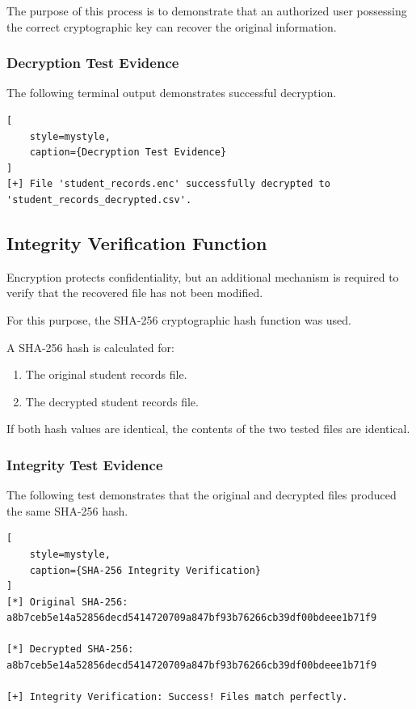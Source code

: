 \documentclass[12pt,a4paper]{article}
\begin{document}
The purpose of this process is to demonstrate that an authorized user possessing the correct cryptographic key can recover the original information.

\subsubsection{Decryption Test Evidence}

The following terminal output demonstrates successful decryption.

\begin{lstlisting}[
    style=mystyle,
    caption={Decryption Test Evidence}
]
[+] File 'student_records.enc' successfully decrypted to 'student_records_decrypted.csv'.
\end{lstlisting}

\subsection{Integrity Verification Function}

Encryption protects confidentiality, but an additional mechanism is required to verify that the recovered file has not been modified.

For this purpose, the SHA-256 cryptographic hash function was used.

A SHA-256 hash is calculated for:

\begin{enumerate}
    \item The original student records file.
    \item The decrypted student records file.
\end{enumerate}

If both hash values are identical, the contents of the two tested files are identical.

\subsubsection{Integrity Test Evidence}

The following test demonstrates that the original and decrypted files produced the same SHA-256 hash.

\begin{lstlisting}[
    style=mystyle,
    caption={SHA-256 Integrity Verification}
]
[*] Original SHA-256:
a8b7ceb5e14a52856decd5414720709a847bf93b76266cb39df00bdeee1b71f9

[*] Decrypted SHA-256:
a8b7ceb5e14a52856decd5414720709a847bf93b76266cb39df00bdeee1b71f9

[+] Integrity Verification: Success! Files match perfectly.
\end{lstlisting}
\end{document}
